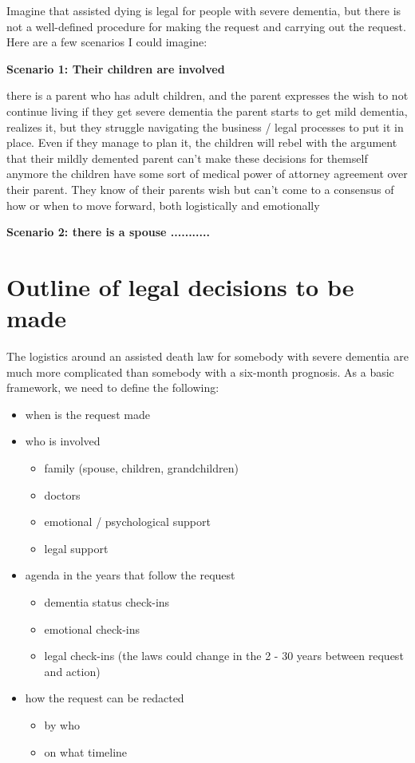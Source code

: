 \documentclass{proposalnsf}
\begin{document}
Imagine that assisted dying is legal for people with severe dementia, but there is not a well-defined procedure for making the request and carrying out the request. Here are a few scenarios I could imagine:

\textbf{Scenario 1: Their children are involved}

    there is a parent who has adult children, and the parent expresses the wish to not continue living if they get severe dementia
    the parent starts to get mild dementia, realizes it, but they struggle navigating the business / legal processes to put it in place. Even if they manage to plan it, the children will rebel with the argument that their mildly demented parent can't make these decisions for themself anymore
    the children have some sort of medical power of attorney agreement over their parent. They know of their parents wish but can't come to a consensus of how or when to move forward, both logistically and emotionally

\textbf{Scenario 2: there is a spouse ...........}


\section{Outline of legal decisions to be made}
The logistics around an assisted death law for somebody with severe dementia are much more complicated than somebody with a six-month prognosis. As a basic framework, we need to define the following:
\begin{itemize}
    \item{when is the request made}

    \item{who is involved}
      \begin{itemize}
          \item{family (spouse, children, grandchildren)}
          \item{doctors}
          \item{emotional / psychological support}
          \item{legal support}
      \end{itemize}

  \item{agenda in the years that follow the request}
      \begin{itemize}
          \item{dementia status check-ins}
          \item{emotional check-ins}
          \item{legal check-ins (the laws could change in the 2 - 30 years between request and action)}
      \end{itemize}

  \item{how the request can be redacted}
      \begin{itemize}
          \item{by who}
          \item{on what timeline}
      \end{itemize}

\end{itemize}
 
\end{document}
